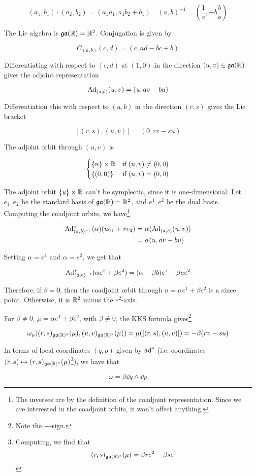\documentclass{article}
\newcommand{\ga}{\mfg\mfa}
\begin{document}
\[(a_1, b_1)\cdot (a_2, b_2) = (a_1a_1, a_1 b_2 + b_1) \quad (a, b)^{-1} = \left(\frac{1}{a}, -b\frac{b}{a}\right)\]

The Lie algebra is \(\ga(\R) = \R^2\). Conjugation is given by

\[C_{(a, b)}(c, d) = (c, ad - bc + b)\]

Differentiating with respect to \((c, d)\) at \((1, 0)\) in the direction \((u, v) \in \ga(\R)\) gives the adjoint representation

\[\operatorname{Ad}_{(a, b)}(u, v) = (u, av - bu)\]

Differentiation this with respect to \((a, b)\) in the direction \((r, s)\) gives the Lie bracket

\[[(r, s), (u, v)] = (0, rv - su)\]

The adjoint orbit through \((u, v)\) is

\[\begin{cases}
    \{u\} \times \mathbb{R} & \text{if }(u, v) \ne (0, 0) \\
    \{(0, 0)\} & \text{if }(u, v) = (0, 0)
\end{cases}\]

The adjoint orbit \(\{u\} \times \mathbb{R}\) can't be symplectic, since it is one-dimensional. Let \(e_1, e_2\) be the standard basis of \(\ga(\R) = \R^2\), and \(e^1, e^2\) be the dual basis. Computing the coadjoint orbits, we have\footnote{The inverses are by the definition of the coadjoint representation. Since we are interested in the coadjoint orbits, it won't affect anything.}

\begin{align*}
    \operatorname{Ad}_{(a, b)^{-1}}^*(\alpha)(ue_1 + ve_2) &= \alpha(\operatorname{Ad}_{(a, b)}(u, v)) \\
    &= \alpha(u, av - bu) \\
\end{align*}

Setting \(\alpha = e^1\) and \(\alpha = e^2\), we get that

\[\operatorname{Ad}_{(a,b)^{-1}}^*(\alpha e^1 + \beta e^2) = (\alpha - \beta b)e^1 + \beta ae^2\]

Therefore, if \(\beta = 0\), then the coadjoint orbit through \(u = \alpha e^1 + \beta e^2\) is a since point. Otherwise, it is \(\mathbb{R}^2\) minus the \(e^2\)-axis.

For \(\beta \ne 0\), \(\mu = \alpha e^1 + \beta e^2\), with \(\beta \ne 0\), the KKS formula gives\footnote{Note the \(-\)-sign.}

\[\omega_\mu((r, s)_{\ga(\R)^*}(\mu), (u, v)_{\ga(\R)^*}(\mu)) = \mu([(r, s), (u, v)]) = -\beta(rv - su)\]

In terms of local coordinates \((q, p)\) given by \(\operatorname{ad}^*\) (i.e. coordinates \((r, s) \mapsto (r, s)_{\ga(\R)^*}(\mu)\)\footnote{Computing, we find that \[(r, s)_{\ga(\R)^*}(\mu) = \beta r e^2 - \beta s e^1\]}), we have that

\[\omega = \beta \dd q \wedge \dd p\]
\end{document}
